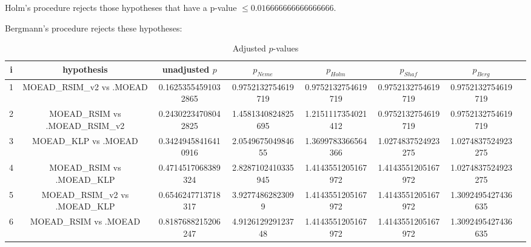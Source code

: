 \documentclass[a4paper,10pt]{article}
\begin{document}
\begin{landscape}
Holm's procedure rejects those hypotheses that have a p-value $\le0.016666666666666666$.


Bergmann's procedure rejects these hypotheses:


\begin{itemize}


\end{itemize}


\begin{table}[!htp]
\centering\tiny
\caption{Adjusted $p$-values}
\begin{tabular}{cccccccc}
i&hypothesis&unadjusted $p$&$p_{Neme}$&$p_{Holm}$&$p_{Shaf}$&$p_{Berg}$\\
\hline
1&MOEAD_RSIM_v2 vs .MOEAD&0.16253554591032865&0.9752132754619719&0.9752132754619719&0.9752132754619719&0.9752132754619719\\
2&MOEAD_RSIM vs .MOEAD_RSIM_v2&0.24302234708042825&1.4581340824825695&1.2151117354021412&0.9752132754619719&0.9752132754619719\\
3&MOEAD_KLP vs .MOEAD&0.34249458416410916&2.054967504984655&1.3699783366564366&1.0274837524923275&1.0274837524923275\\
4&MOEAD_RSIM vs .MOEAD_KLP&0.4714517068389324&2.8287102410335945&1.4143551205167972&1.4143551205167972&1.0274837524923275\\
5&MOEAD_RSIM_v2 vs .MOEAD_KLP&0.6546247713718317&3.92774862823099&1.4143551205167972&1.4143551205167972&1.3092495427436635\\
6&MOEAD_RSIM vs .MOEAD&0.8187688215206247&4.912612929123748&1.4143551205167972&1.4143551205167972&1.3092495427436635\\
\hline
\end{tabular}
\end{table}

\end{landscape}
\end{document}
